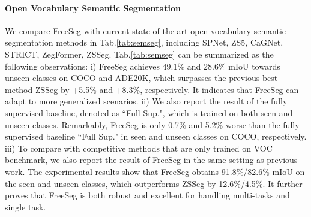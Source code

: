 \documentclass[10pt,twocolumn,letterpaper]{article}
\begin{document}
\paragraph{Open Vocabulary Semantic Segmentation}
We compare FreeSeg with current state-of-the-art open vocabulary semantic segmentation methods in Tab.\ref{tab:semseg},  including SPNet\cite{xian2019semantic}, ZS5\cite{bucher2019zero}, CaGNet\cite{gu2020context}, STRICT\cite{pastore2021closer}, ZegFormer\cite{ding2022decoupling}, ZSSeg\cite{xu2021simple}.
Tab.\ref{tab:semseg} can be summarized as the following observations:
i) FreeSeg achieves 49.1\% and 28.6\% mIoU towards unseen classes on COCO and ADE20K, which surpasses the previous best method ZSSeg by +5.5\%  and +8.3\%, respectively. It indicates that FreeSeg can adapt to more generalized scenarios.
ii) 
We also report the result of the fully supervised baseline, denoted as ``Full Sup.", which is trained on both seen and unseen classes.
Remarkably, FreeSeg is only 0.7\% and 5.2\% worse than the fully supervised baseline ``Full Sup." in seen and unseen classes on COCO, respectively.
iii) To compare with competitive methods that are only trained on VOC benchmark, we also report the result of FreeSeg in the same setting as previous work. The experimental results show that FreeSeg obtains 91.8\%/82.6\% mIoU on the seen and unseen classes, which outperforms ZSSeg by 12.6\%/4.5\%. It further proves that FreeSeg is both robust and excellent for handling multi-tasks and single task.
\end{document}
